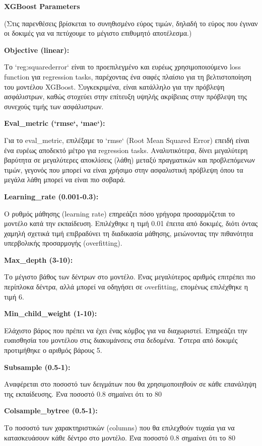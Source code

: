 \documentclass{llncs}
\begin{document}
\noindent \textbf{XGBoost Parameters}

(Στις παρενθέσεις βρίσκεται το συνηθισμένο εύρος τιμών, δηλαδή το εύρος που έγιναν οι δοκιμές για να πετύχουμε το μέγιστο επιθυμητό αποτέλεσμα.)

\noindent \textbf{Objective (linear):}

Το `reg:squarederror` είναι το προεπιλεγμένο και ευρέως χρησιμοποιούμενο loss function για regression tasks, παρέχοντας ένα σαφές πλαίσιο για τη βελτιστοποίηση του μοντέλου XGBoost. Συγκεκριμένα, είναι κατάλληλο για την πρόβλεψη ασφάλιστρων, καθώς στοχεύει στην επίτευξη υψηλής ακρίβειας στην πρόβλεψη της συνεχούς τιμής των ασφάλιστρων.

\noindent \textbf{Eval\_metric (`rmse`, `mae`):}

Για το eval\_metric, επιλέξαμε το `rmse` (Root Mean Squared Error) επειδή είναι ένα ευρέως αποδεκτό μέτρο για regression tasks. Αναλυτικότερα, δίνει μεγαλύτερη βαρύτητα σε μεγαλύτερες αποκλίσεις (λάθη) μεταξύ πραγματικών και προβλεπόμενων τιμών, γεγονός που μπορεί να είναι χρήσιμο στην ασφαλιστική πρόβλεψη όπου τα μεγάλα λάθη μπορεί να είναι πιο σοβαρά.

\noindent \textbf{Learning\_rate (0.001-0.3):}

Ο ρυθμός μάθησης (learning rate) επηρεάζει πόσο γρήγορα προσαρμόζεται το μοντέλο κατά την εκπαίδευση. Επιλέχθηκε η τιμή 0.01 έπειτα από δοκιμές, διότι όντας χαμηλή σχετικά τιμή επιβραδύνει τη διαδικασία μάθησης, μειώνοντας την πιθανότητα υπερβολικής προσαρμογής (overfitting).

\noindent \textbf{Max\_depth (3-10):}

Το μέγιστο βάθος των δέντρων στο μοντέλο. Ένας μεγαλύτερος αριθμός επιτρέπει πιο περίπλοκα δέντρα, αλλά μπορεί να οδηγήσει σε overfitting, επομένως επιλέχθηκε η τιμή 6.

\noindent \textbf{Min\_child\_weight (1-10):}

Ελάχιστο βάρος που πρέπει να έχει ένας κόμβος για να διαχωριστεί. Επηρεάζει την ευαισθησία του μοντέλου στις διακυμάνσεις στα δεδομένα. Ύστερα από δοκιμές προτιμήθηκε ο αριθμός βάρους 5.

\noindent \textbf{Subsample (0.5-1):}

Αναφέρεται στο ποσοστό των δειγμάτων που θα χρησιμοποιηθούν σε κάθε επανάληψη της εκπαίδευσης. Ένα ποσοστό 0.8 σημαίνει ότι το 80%

\noindent \textbf{Colsample\_bytree (0.5-1):}

Το ποσοστό των χαρακτηριστικών (columns) που θα επιλεχθούν τυχαία για να κατασκευάσουν κάθε δέντρο στο μοντέλο. Ένα ποσοστό 0.8 σημαίνει ότι το 80%
\end{document}
